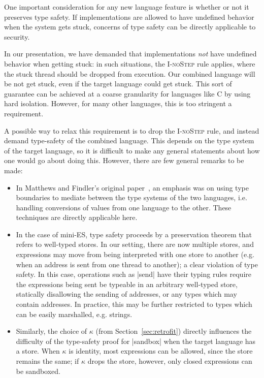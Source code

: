 One important consideration for any new language feature is whether
or not it preserves type safety.  If implementations are allowed to
have undefined behavior when the system gets stuck, concerns of type
safety can be directly applicable to security.

In our presentation, we have demanded that implementations \emph{not}
have undefined behavior when getting stuck: in such situations, the
\textsc{I-noStep} rule applies, where the stuck thread should be dropped
from execution.  Our combined language will be not get stuck, even if
the target language could get stuck.  This sort of guarantee can be
achieved at a coarse granularity for languages like C by using hard
isolation.  However, for many other languages, this is too stringent a
requirement.

A possible way to relax this requirement is to drop the \textsc{I-noStep}
rule, and instead demand type-safety of the combined language.  This
depends on the type system of the target language, so it is difficult to
make any general statements about how one would go about doing this.  However,
there are few general remarks to be made:

\begin{itemize}
    \item In Matthews and Findler's original
        paper~\cite{Matthews:2007:OSM:1190216.1190220}, an emphasis was
        on using type boundaries to mediate between the type systems of
        the two languages, i.e. handling conversions of values from
        one language to the other.  These techniques are directly applicable here.

    \item In the case of mini-ES, type safety proceeds by a preservation theorem
        that refers to well-typed stores.  In our setting, there are now multiple
        stores, and expressions may move from being interpreted with one store
        to another (e.g. when an address is sent from one thread to
        another); a clear violation of type safety.  In this case, operations
        such as |send| have their typing rules require
        the expressions being sent be typeable in an arbitrary well-typed store,
        statically disallowing the sending of addresses, or any types which
        may contain addresses.  In practice, this may be further restricted to
        types which can be easily marshalled, e.g. strings.

    \item Similarly, the choice of $\kappa$ (from Section~\ref{sec:retrofit}) directly
        influences the difficulty of the type-safety proof for
        |sandbox| when the target language has a store.  When
        $\kappa$ is identity, most expressions can be allowed, since the store
        remains the same; if $\kappa$ drops the store, however, only closed expressions
        can be sandboxed.
\end{itemize}

